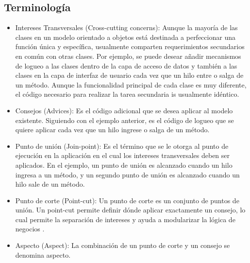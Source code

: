 \subsection{Terminología}
\begin{itemize}
  \item Intereses Transversales (Cross-cutting concerns): Aunque la mayoría de
  las clases en un modelo orientado a objetos está destinada a perfeccionar una función única y
  específica, usualmente comparten requerimientos secundarios en común con otras
  clases. Por ejemplo, se puede desear añadir mecanismos de logueo a las clases
  dentro de la capa de acceso de datos y también a las clases en la capa de
  interfaz de usuario cada vez que un hilo entre o salga de un método. Aunque la
  funcionalidad principal de cada clase es muy diferente, el código necesario
  para realizar la tarea secundaria is usualmente
  idéntico.\cite{Introduction_To_Aspect}
  
  \item Consejos (Advices): Es el código adicional que se desea aplicar al
  modelo existente. Siguiendo con el ejemplo anterior, es el código de logueo
  que se quiere aplicar cada vez que un hilo ingrese o salga de un
  método.\cite{Introduction_To_Aspect}
  
  \item Punto de unión (Join-point): Es el término que se le otorga al punto
  de ejecución en la aplicación en el cual los intereses transversales deben ser
  aplicados. En el ejemplo, un punto de unión es alcanzado cuando un hilo
  ingresa a un método, y un segundo punto de unión es alcanzado cuando un hilo
  sale de un método.
  
  \item Punto de corte (Point-cut): Un punto de corte es un conjunto de puntos
  de unión. Un point-cut permite definir dónde aplicar exactamente un consejo,
  lo cual permite la separación de intereses y ayuda a modularizar la lógica de
  negocios \cite{Classification_Of_Pointcut_Language_Constructs}.
  
  \item Aspecto (Aspect): La combinación de un punto de corte y un consejo se
  denomina aspecto. \cite{Introduction_To_Aspect}
\end{itemize} 
